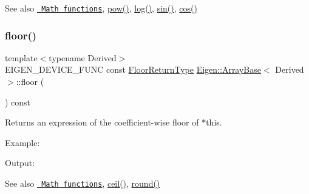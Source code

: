 \begin{DoxySeeAlso}{See also}
\href{group__CoeffwiseMathFunctions.html\#cwisetable_exp}{\texttt{ Math functions}}, \mbox{\hyperlink{class_eigen_1_1_array_base_ab6dc101d82e8228a19a8840e3a29c1c9}{pow()}}, \mbox{\hyperlink{class_eigen_1_1_array_base_a7748ba1f6891fa4e10723a8bf77b8770}{log()}}, \mbox{\hyperlink{class_eigen_1_1_array_base_a8f857f93533ac386282f47c5ef05459a}{sin()}}, \mbox{\hyperlink{class_eigen_1_1_array_base_abe1bff4421b16e62e75f932b83c4d31f}{cos()}} 
\end{DoxySeeAlso}
\mbox{\label{class_eigen_1_1_array_base_a1dbd24e0b04ddd157436086266f917fd}} 
\subsubsection{\texorpdfstring{floor()}{floor()}}
{\footnotesize\ttfamily template$<$typename Derived$>$ \\
E\+I\+G\+E\+N\+\_\+\+D\+E\+V\+I\+C\+E\+\_\+\+F\+U\+NC const \mbox{\hyperlink{class_eigen_1_1_cwise_unary_op}{Floor\+Return\+Type}} \mbox{\hyperlink{class_eigen_1_1_array_base}{Eigen\+::\+Array\+Base}}$<$ Derived $>$\+::floor (\begin{DoxyParamCaption}{ }\end{DoxyParamCaption}) const\hspace{0.3cm}{\ttfamily [inline]}}

\begin{DoxyReturn}{Returns}
an expression of the coefficient-\/wise floor of $\ast$this.
\end{DoxyReturn}
Example\+: 
\begin{DoxyCodeInclude}{0}
\end{DoxyCodeInclude}
 Output\+: 
\begin{DoxyVerbInclude}
\end{DoxyVerbInclude}


\begin{DoxySeeAlso}{See also}
\href{group__CoeffwiseMathFunctions.html\#cwisetable_floor}{\texttt{ Math functions}}, \mbox{\hyperlink{class_eigen_1_1_array_base_a644fa9e672def0cd2bdab1f4efe6400e}{ceil()}}, \mbox{\hyperlink{class_eigen_1_1_array_base_a354b5032ab3852a015a55b4dbf257d3d}{round()}} 
\end{DoxySeeAlso}
\mbox{\label{class_eigen_1_1_array_base_ac0e2019654b0bf1e82ada75b3ea9e5ef}} 

